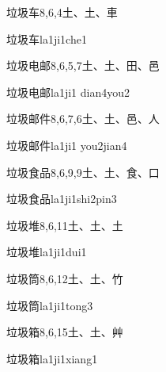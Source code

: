 \begin{Entry}{垃圾车}{8,6,4}{⼟、⼟、⾞}
  \begin{Phonetics}{垃圾车}{la1ji1che1}
  \end{Phonetics}
\end{Entry}

\begin{Entry}{垃圾电邮}{8,6,5,7}{⼟、⼟、⽥、⾢}
  \begin{Phonetics}{垃圾电邮}{la1ji1 dian4you2}
  \end{Phonetics}
\end{Entry}

\begin{Entry}{垃圾邮件}{8,6,7,6}{⼟、⼟、⾢、⼈}
  \begin{Phonetics}{垃圾邮件}{la1ji1 you2jian4}
  \end{Phonetics}
\end{Entry}

\begin{Entry}{垃圾食品}{8,6,9,9}{⼟、⼟、⾷、⼝}
  \begin{Phonetics}{垃圾食品}{la1ji1shi2pin3}
  \end{Phonetics}
\end{Entry}

\begin{Entry}{垃圾堆}{8,6,11}{⼟、⼟、⼟}
  \begin{Phonetics}{垃圾堆}{la1ji1dui1}
  \end{Phonetics}
\end{Entry}

\begin{Entry}{垃圾筒}{8,6,12}{⼟、⼟、⽵}
  \begin{Phonetics}{垃圾筒}{la1ji1tong3}
  \end{Phonetics}
\end{Entry}

\begin{Entry}{垃圾箱}{8,6,15}{⼟、⼟、⾋}
  \begin{Phonetics}{垃圾箱}{la1ji1xiang1}
  \end{Phonetics}
\end{Entry}

